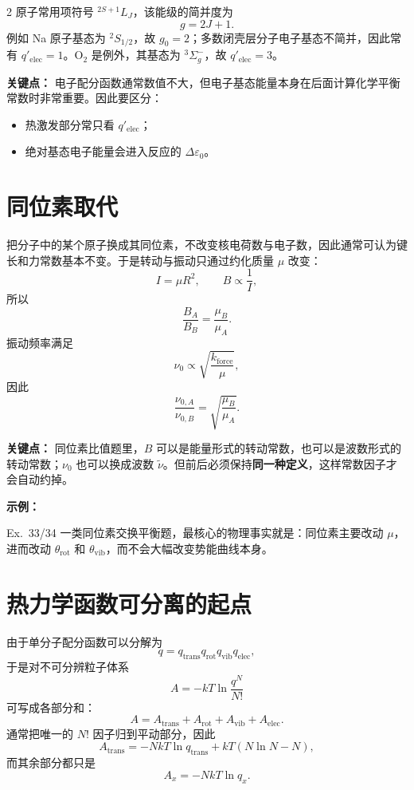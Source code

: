 \documentclass[a4paper,9pt]{article}
\newenvironment{keypoint}
{\par\vspace{0.3em}\noindent\begin{tcolorbox}[colback=keybg,colframe=keycolor,boxrule=0.5pt,arc=2pt,left=2pt,right=2pt,top=2pt,bottom=2pt,boxsep=0pt]\noindent\textcolor{keycolor}{\textbf{关键点：}}}
{\end{tcolorbox}\par\vspace{0.3em}}
\newenvironment{examplebox}
{\par\vspace{0.3em}\noindent\begin{tcolorbox}[colback=boxbg,colframe=derivcolor,boxrule=0.5pt,arc=2pt,left=2pt,right=2pt,top=2pt,bottom=2pt,boxsep=0pt]\scriptsize\noindent\textcolor{derivcolor}{\textbf{示例：}}\par\setlength{\parskip}{0.1ex}\setlength{\itemsep}{0pt}\setlength{\parsep}{0pt}}
{\end{tcolorbox}\par\vspace{0.3em}}
\begin{document}
\begin{multicols}{2}
	原子常用项符号 $^{2S+1}L_J$，该能级的简并度为
	\[
		g=2J+1.
	\]
	例如 Na 原子基态为 $^2S_{1/2}$，故 $g_0=2$；多数闭壳层分子电子基态不简并，因此常有 $q'_{\mathrm{elec}}=1$。O$_2$ 是例外，其基态为 $^3\Sigma_g^-$，故 $q'_{\mathrm{elec}}=3$。

	\begin{keypoint}
		电子配分函数通常数值不大，但电子基态能量本身在后面计算化学平衡常数时非常重要。因此要区分：
		\begin{itemize}
			\item 热激发部分常只看 $q'_{\mathrm{elec}}$；
			\item 绝对基态电子能量会进入反应的 $\Delta\varepsilon_0$。
		\end{itemize}
	\end{keypoint}

	\section{同位素取代}

	把分子中的某个原子换成其同位素，不改变核电荷数与电子数，因此通常可认为键长和力常数基本不变。于是转动与振动只通过约化质量 $\mu$ 改变：
	\[
		I=\mu R^2,
		\qquad
		B\propto \frac1I,
	\]
	所以
	\[
		\frac{B_A}{B_B}=\frac{\mu_B}{\mu_A}.
	\]
	振动频率满足
	\[
		\nu_0\propto \sqrt{\frac{k_{\mathrm{force}}}{\mu}},
	\]
	因此
	\[
		\frac{\nu_{0,A}}{\nu_{0,B}}=\sqrt{\frac{\mu_B}{\mu_A}}.
	\]

	\begin{keypoint}
		同位素比值题里，$B$ 可以是能量形式的转动常数，也可以是波数形式的转动常数；$\nu_0$ 也可以换成波数 $\tilde\nu$。但前后必须保持\textbf{同一种定义}，这样常数因子才会自动约掉。
	\end{keypoint}

	\begin{examplebox}
		Ex.~33/34 一类同位素交换平衡题，最核心的物理事实就是：同位素主要改动 $\mu$，进而改动 $\theta_{\mathrm{rot}}$ 和 $\theta_{\mathrm{vib}}$，而不会大幅改变势能曲线本身。
	\end{examplebox}

	\section{热力学函数可分离的起点}

	由于单分子配分函数可以分解为
	\[
		q=q_{\mathrm{trans}}q_{\mathrm{rot}}q_{\mathrm{vib}}q_{\mathrm{elec}},
	\]
	于是对不可分辨粒子体系
	\[
		A=-kT\ln\frac{q^N}{N!}
	\]
	可写成各部分和：
	\[
		A=A_{\mathrm{trans}}+A_{\mathrm{rot}}+A_{\mathrm{vib}}+A_{\mathrm{elec}}.
	\]
	通常把唯一的 $N!$ 因子归到平动部分，因此
	\[
		A_{\mathrm{trans}}=-NkT\ln q_{\mathrm{trans}}+kT(N\ln N-N),
	\]
	而其余部分都只是
	\[
		A_x=-NkT\ln q_x.
	\]


\end{multicols}
\end{document}
